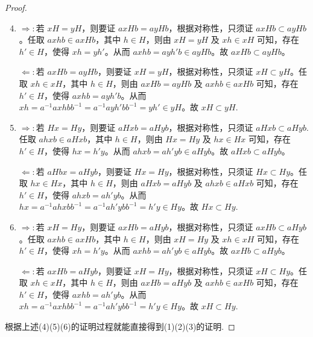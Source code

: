 \documentclass[../../main.tex]{subfiles}
\begin{document}
\begin{proof}
\begin{enumerate}[(1)]\setcounter{enumi}{3}
\item $\Rightarrow:$若 \(xH = yH\)，则要证 \(axHb = ayHb\)，根据对称性，只须证 \(axHb \subset ayHb\)。任取 \(axhb \in axHb\)，其中 \(h \in H\)，则由 \(xH = yH\) 及 \(xh \in xH\) 可知，存在 \(h' \in H\)，使得 \(xh = yh'\)。从而 \(axhb = ayh'b \in ayHb\)。故 \(axHb \subset ayHb\)。

$\Leftarrow:$若 \(axHb = ayHb\)，则要证 \(xH = yH\)，根据对称性，只须证 \(xH \subset yH\)。任取 \(xh \in xH\)，其中 \(h \in H\)，则由 \(axHb = ayHb\) 及 \(axhb \in axHb\) 可知，存在 \(h' \in H\)，使得 \(axhb = ayh'b\)。从而 \(xh = a^{-1}axhbb^{-1} = a^{-1}ayh'bb^{-1} = yh' \in yH\)。故 \(xH \subset yH\).

\item $\Rightarrow:$若 \(Hx = Hy\)，则要证 \(aHxb = aHyb\)，根据对称性，只须证 \(aHxb \subset aHyb\).任取 \(ahxb \in aHxb\)，其中 \(h \in H\)，则由 \(Hx = Hy\) 及 \(hx \in Hx\) 可知，存在 \(h' \in H\)，使得 \(hx = h'y\)。从而 \(ahxb = ah'yb \in aHyb\)。故 \(aHxb \subset aHyb\)。

$\Leftarrow:$若 \(aHbx = aHyb\)，则要证 \(Hx = Hy\)，根据对称性，只须证 \(Hx \subset Hy\)。任取 \(hx \in Hx\)，其中 \(h \in H\)，则由 \(aHxb = aHyb\) 及 \(ahxb \in aHxb\) 可知，存在 \(h' \in H\)，使得 \(ahxb = ah'yb\)。从而 \(hx = a^{-1}ahxbb^{-1} = a^{-1}ah'ybb^{-1} = h'y \in Hy\)。故 \(Hx \subset Hy\).

\item $\Rightarrow:$若 \(xH = Hy\)，则要证 \(axHb = aHyb\)，根据对称性，只须证 \(axHb \subset aHyb\)。任取 \(axhb \in axHb\)，其中 \(h \in H\)，则由 \(xH = Hy\) 及 \(xh \in xH\) 可知，存在 \(h' \in H\)，使得 \(xh = h'y\)。从而 \(axhb = ah'yb \in aHyb\)。故 \(axHb \subset aHyb\)。

$\Leftarrow:$若 \(axHb = aHyb\)，则要证 \(xH = Hy\)，根据对称性，只须证 \(xH \subset Hy\)。任取 \(xh \in xH\)，其中 \(h \in H\)，则由 \(axHb = aHyb\) 及 \(axhb \in axHb\) 可知，存在 \(h' \in H\)，使得 \(axhb = ah'yb\)。从而 \(xh = a^{-1}axhbb^{-1} = a^{-1}ah'ybb^{-1} = h'y \in Hy\)。故 \(xH \subset Hy\).
\end{enumerate}

根据上述(4)(5)(6)的证明过程就能直接得到(1)(2)(3)的证明.

\end{proof}
\end{document}
